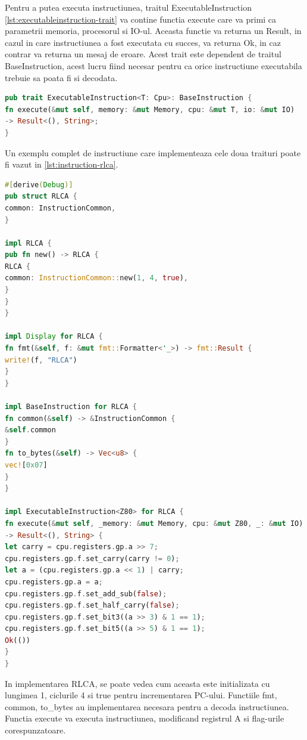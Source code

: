 \documentclass[titlepage,12pt]{article}
\DeclareRobustCommand{\code}[1]{{\ttfamily\small #1}}
\begin{document}
Pentru a putea executa instructiunea, traitul \code{ExecutableInstruction} \cref{lst:executableinstruction-trait} va contine functia execute care va primi ca parametrii memoria, procesorul si IO-ul. Aceasta functie va returna un \code{Result}, in cazul in care instructiunea a fost executata cu succes, va returna \code{Ok}, in caz contrar va returna un mesaj de eroare. Acest trait este dependent de traitul \code{BaseInstruction}, acest lucru fiind necesar pentru ca orice instructiune executabila trebuie sa poata fi si decodata.

\begin{lstlisting}[language=Rust,caption={Trait ExecutableInstruction},label={lst:executableinstruction-trait}]
pub trait ExecutableInstruction<T: Cpu>: BaseInstruction {
fn execute(&mut self, memory: &mut Memory, cpu: &mut T, io: &mut IO)
-> Result<(), String>;
}
\end{lstlisting}

Un exemplu complet de instructiune care implementeaza cele doua traituri poate fi vazut in \cref{lst:instruction-rlca}.
\begin{lstlisting}[language=Rust,caption={Exemplu instructiune},label={lst:instruction-rlca}]
#[derive(Debug)]
pub struct RLCA {
common: InstructionCommon,
}

impl RLCA {
pub fn new() -> RLCA {
RLCA {
common: InstructionCommon::new(1, 4, true),
}
}
}

impl Display for RLCA {
fn fmt(&self, f: &mut fmt::Formatter<'_>) -> fmt::Result {
write!(f, "RLCA")
}
}

impl BaseInstruction for RLCA {
fn common(&self) -> &InstructionCommon {
&self.common
}
fn to_bytes(&self) -> Vec<u8> {
vec![0x07]
}
}

impl ExecutableInstruction<Z80> for RLCA {
fn execute(&mut self, _memory: &mut Memory, cpu: &mut Z80, _: &mut IO)
-> Result<(), String> {
let carry = cpu.registers.gp.a >> 7;
cpu.registers.gp.f.set_carry(carry != 0);
let a = (cpu.registers.gp.a << 1) | carry;
cpu.registers.gp.a = a;
cpu.registers.gp.f.set_add_sub(false);
cpu.registers.gp.f.set_half_carry(false);
cpu.registers.gp.f.set_bit3((a >> 3) & 1 == 1);
cpu.registers.gp.f.set_bit5((a >> 5) & 1 == 1);
Ok(())
}
}
\end{lstlisting}

In implementarea \code{RLCA}, se poate vedea cum aceasta este initializata cu lungimea 1, ciclurile 4 si true pentru incrementarea PC-ului. Functiile \code{fmt}, \code{common}, \code{to\_bytes} au implementarea necesara pentru a decoda instructiunea.
Functia execute va executa instructiunea, modificand registrul A si flag-urile corespunzatoare.
\end{document}
